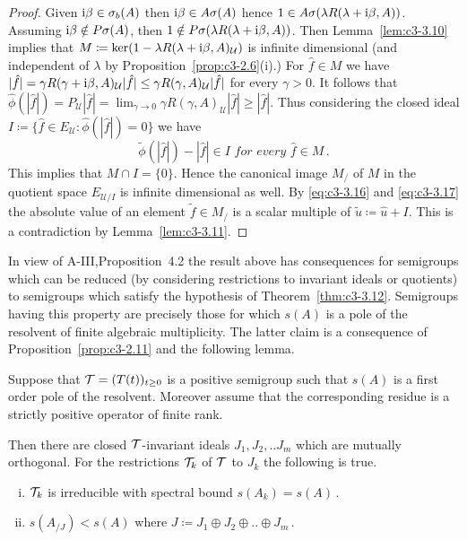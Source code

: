 \begin{proof}
	Given $\mathrm{i}\beta \in \sigma_{b}(A)$ then $\mathrm{i}\beta \in A\sigma(A)$ hence $1 \in A\sigma(\lambda R(\lambda+\mathrm{i}\beta,A))$.
	Assuming $\mathrm{i}\beta \notin P\sigma(A)$, then $1 \notin P\sigma(\lambda R(\lambda+\mathrm{i}\beta,A))$.
	Then Lemma~\ref{lem:c3-3.10} implies that $M \coloneqq \ker(1 - \lambda R(\lambda+\mathrm{i}\beta,A)_{\mathcal{U}})$ is infinite dimensional (and independent of $\lambda$ by Proposition~\ref{prop:c3-2.6}(i).)
	For $\hat{f} \in M$ we have $|\hat{f}| = \gamma R(\gamma+\mathrm{i}\beta,A)_{\mathcal{U}}|\hat{f}| \leq \gamma R(\gamma,A)_{\mathcal{U}}|\hat{f}|$ for every $\gamma > 0$.
	It follows that $\hat{\phi}(|\hat{f}|) = P_{\mathcal{U}}|\hat{f}| = \lim_{\gamma\to 0}\gamma R(\gamma,A)_{\mathcal{U}}|\hat{f}| \geq |\hat{f}|$.
	Thus considering the closed ideal $I \coloneqq \{\hat{f} \in E_{\mathcal{U}} \colon \hat{\phi}(|\hat{f}|) = 0\}$ we have
%
%
	\begin{equation}\label{eq:c3-3.17}
		\tilde{\phi}(|\hat{f}|) - |\hat{f}| \in I \textit{ for every } \hat{f} \in M\,.
	\end{equation}
	This implies that $M \cap I = \{0\}$. 
	Hence the canonical image $M_/$ of $M$ in the quotient space $E_{\mathcal{U}/{I}}$ is infinite dimensional as well. 
	By \eqref{eq:c3-3.16} and \eqref{eq:c3-3.17} the absolute value of an element $\tilde{f} \in M_/$ is a scalar multiple of $\tilde{u} \coloneqq \hat{u} + I$. 
	This is a contradiction by Lemma~\ref{lem:c3-3.11}.
\end{proof}

In view of A-III,Proposition~4.2 the result above has consequences for semigroups which can be reduced (by considering restrictions to invariant ideals or quotients) to semigroups which satisfy the hypothesis of Theorem~\ref{thm:c3-3.12}. 
Semigroups having this property are precisely those for which $s(A)$ is a pole of the resolvent of finite algebraic multiplicity. 
The latter claim is a consequence of Proposition~\ref{prop:c3-2.11} and the following lemma.

\begin{lemma}\label{lem:c3-3.13}
	Suppose that $\mathcal{T} = (T(t))_{t \ge 0}$ is a positive semigroup such that $s(A)$ is a first order pole of the resolvent. 
	Moreover assume that the corresponding residue is a strictly positive operator of finite rank.
	
	Then there are closed $\mathcal{T}$-invariant ideals $J_{1},J_{2}, .. J_{m}$ which are mutually orthogonal. 
	For the restrictions  $\mathcal{T}_{k}$ of $\mathcal{T}$ to $J_{k}$ the following is true.
	\begin{enumerate}[(i)]
		\item $\mathcal{T}_{k}$ is irreducible with spectral bound $s(A_k) = s(A)$\,.
		\item $s(A_{/J}) < s(A)$  where $J \coloneqq  J_{1}\oplus J_{2}\oplus .. \oplus J_{m}\,.$
	\end{enumerate}
\end{lemma}

